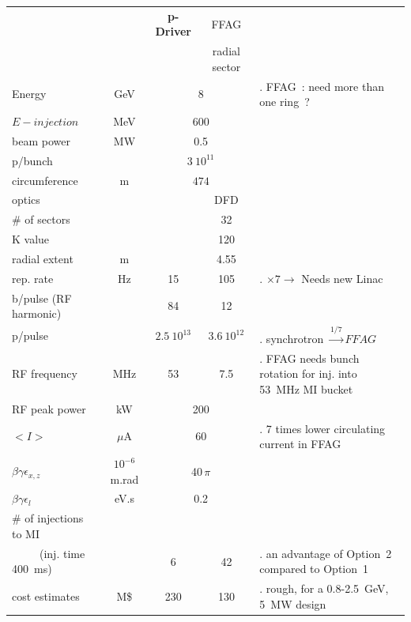 \documentclass[12pt]{article}
\begin{document}
\begin{minipage}{1.\linewidth}
\begin{center}
\fontsize{17}{19} \selectfont
\begin{tabular}{lc|c|c|l}
\\
             &     & \bf p-Driver& FFAG&     \\
             &     &             & radial sector  \\
Energy   & GeV &     \multicolumn{2}{|c|}{8 }        &   . FFAG~: need more than one ring~?       \\
$E-{injection}$    & MeV &        \multicolumn{2}{|c|}{600}    &          \\
beam power         &  MW &     \multicolumn{2}{|c|}{0.5}        &   \\
 p/bunch           &     &  \multicolumn{2}{|c|}{$3\ 10^{11}$} &          \\
circumference      &  m  &  \multicolumn{2}{|c|}{$474$} &          \\
 optics            &     &                &  DFD  \\
\# of sectors      &     &                &     32 \\
  K value          &     &                &   120 \\
  radial extent    & m   &                &   4.55 \\
rep. rate          & Hz  &        15      &       105        &  . $\times 7 \rightarrow$ Needs new Linac   \\
 b/pulse (RF harmonic)&  &        84      &      12          &  \\
 p/pulse           &     & $2.5\ 10^{13}$ & $3.6\ 10^{12}$   & . synchrotron  $\stackrel{1/7}{\longrightarrow} FFAG$      \\
RF frequency       & MHz &        53      &       7.5        &  . FFAG needs bunch rotation for inj. into 53~MHz MI bucket \\ 
RF peak power      & kW &      \multicolumn{2}{|c|}{200}       & \\
 $<I>$             &$\mu$A&    \multicolumn{2}{|c|}{60}        & . 7 times lower circulating current  in FFAG       \\
$\beta \gamma \epsilon_{x,z}$&$10^{-6}$m.rad&\multicolumn{2}{|c|}{40$\,\pi$}  &        \\
$\beta \gamma \epsilon_l$& eV.s &            \multicolumn{2}{|c|}{0.2}  &        \\
\# of injections to MI & &       \multicolumn{2}{|c|}{ }   \\
 ~ ~ ~ (inj. time 400~ms) &&      6      &        42  &  . an advantage of Option~2 compared to Option~1 \\ 
cost estimates     & M\$ &      230       &      130  & . rough, for a 0.8-2.5~GeV, 5~MW design      \\
\end{tabular}
\end{center}


\end{minipage}
\end{document}
